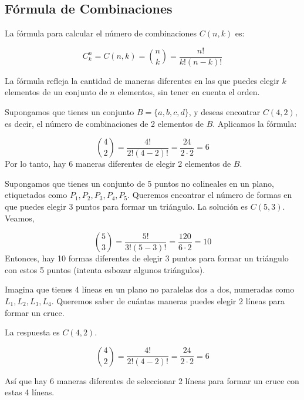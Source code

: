 \subsection{Fórmula de Combinaciones}

La fórmula para calcular el número de combinaciones \( C(n, k) \) es:

\[ C_{k}^n=C(n, k) = \binom{n}{k} = \frac{n!}{k!(n-k)!} \]

La fórmula refleja la cantidad de maneras diferentes en las que puedes elegir \( k \) elementos de un conjunto de \( n \) elementos, sin tener en cuenta el orden.

\begin{ejemplo}
Supongamos que tienes un conjunto \( B = \{a, b, c, d\} \), y deseas encontrar \( C(4, 2) \), es decir, el número de combinaciones de 2 elementos de \( B \). Aplicamos la fórmula:

\[ \binom{4}{2} = \frac{4!}{2!(4-2)!} = \frac{24}{2 \cdot 2} = 6 \]
Por lo tanto, hay $6$ maneras diferentes de elegir 2 elementos de \( B \).
\end{ejemplo}\vspace{0.3cm}

\begin{ejemplo}
Supongamos que tienes un conjunto de 5 puntos no colineales en un plano, etiquetados como \( P_1, P_2, P_3, P_4, P_5 \). Queremos encontrar el número de formas en que puedes elegir 3 puntos para formar un triángulo. La solución es \( C(5, 3) \). Veamos,

\[ \binom{5}{3} = \frac{5!}{3!(5-3)!} = \frac{120}{6 \cdot 2} = 10 \]
Entonces, hay 10 formas diferentes de elegir 3 puntos para formar un triángulo con estos 5 puntos (intenta esbozar algunos triángulos).
\end{ejemplo}\vspace{0.3cm}

\begin{ejemplo}
Imagina que tienes 4 líneas en un plano no paralelas dos a dos, numeradas como \( L_1, L_2, L_3, L_4 \). Queremos saber de cuántas maneras puedes elegir 2 líneas para formar un cruce. 
\end{ejemplo}

\begin{solucion}
La respuesta es \( C(4, 2) \).

\[ \binom{4}{2} = \frac{4!}{2!(4-2)!} = \frac{24}{2 \cdot 2} = 6 \]

Así que hay 6 maneras diferentes de seleccionar 2 líneas para formar un cruce con estas 4 líneas.
\end{solucion}



